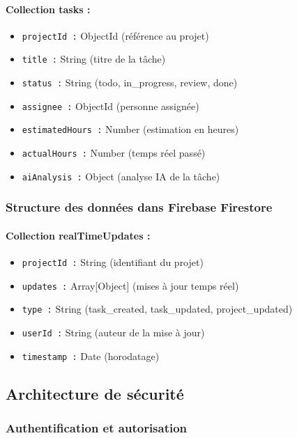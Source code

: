 \paragraph{Collection tasks :}
\begin{itemize}
    \item \texttt{projectId :} ObjectId (référence au projet)
    \item \texttt{title :} String (titre de la tâche)
    \item \texttt{status :} String (todo, in\_progress, review, done)
    \item \texttt{assignee :} ObjectId (personne assignée)
    \item \texttt{estimatedHours :} Number (estimation en heures)
    \item \texttt{actualHours :} Number (temps réel passé)
    \item \texttt{aiAnalysis :} Object (analyse IA de la tâche)
\end{itemize}

\subsubsection{Structure des données dans Firebase Firestore}

\paragraph{Collection realTimeUpdates :}
\begin{itemize}
    \item \texttt{projectId :} String (identifiant du projet)
    \item \texttt{updates :} Array[Object] (mises à jour temps réel)
    \item \texttt{type :} String (task\_created, task\_updated, project\_updated)
    \item \texttt{userId :} String (auteur de la mise à jour)
    \item \texttt{timestamp :} Date (horodatage)
\end{itemize}

\subsection{Architecture de sécurité}

\subsubsection{Authentification et autorisation}

